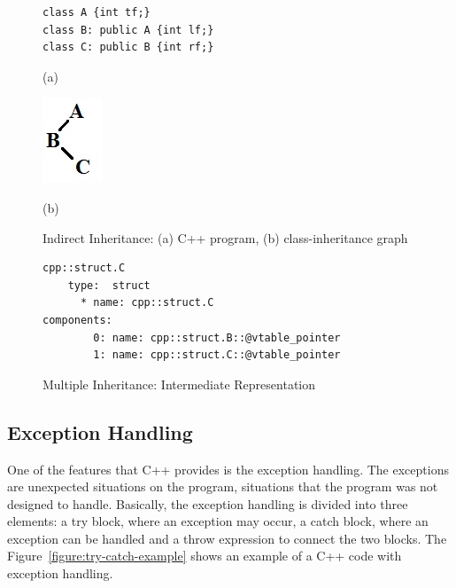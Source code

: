 \documentclass[a4paper]{llncs}
\begin{document}
\begin{figure}[h]

\begin{minipage}[b]{.48\linewidth}
\begin{lstlisting}
class A {int tf;}
class B: public A {int lf;}
class C: public B {int rf;}
\end{lstlisting}
  \centerline{(a)}\medskip
\end{minipage}
\label{figure:indirect-inheritance-code}
%
\begin{minipage}[b]{.48\linewidth}
  \centering
  \centerline{\includegraphics[scale=0.6]{figures/indirect_inheritance}}
  \centerline{(b)}\medskip
\end{minipage}
%
\caption{Indirect Inheritance: (a) C++ program, (b) class-inheritance graph}
\label{fig:indirect-inheritance-graph}
\end{figure}

\begin{figure}[h]
\centering
\begin{minipage}{0.9\textwidth}
\begin{lstlisting}[style=nonumbers]
cpp::struct.C
    type:  struct
      * name: cpp::struct.C
components: 
        0: name: cpp::struct.B::@vtable_pointer
        1: name: cpp::struct.C::@vtable_pointer
\end{lstlisting}
\end{minipage}
\caption{Multiple Inheritance: Intermediate Representation}
\label{figure:indirect-inheritance-IR}
\end{figure}

\subsection{Exception Handling}

One of the features that C++ provides is the exception handling. The exceptions are unexpected situations on the program, situations 
that the program was not designed to handle. Basically, the exception handling is divided into three elements: a try block, where an 
exception may occur, a catch block, where an exception can be handled and a throw expression to connect the two blocks. The 
Figure~\ref{figure:try-catch-example} shows an example of a C++ code with exception handling.
\end{document}
